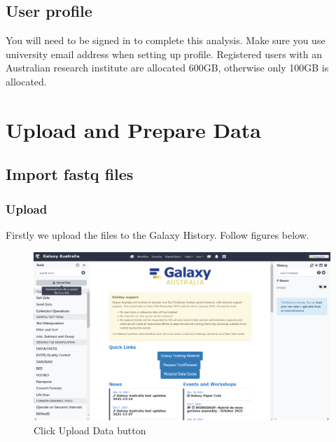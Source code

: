 \documentclass[
]{book}
\begin{document}
\hypertarget{user-profile}{%
\section*{User profile}\label{user-profile}}

You will need to be signed in to complete this analysis. Make sure you use university email address when setting up profile. Registered users with an Australian research institute are allocated 600GB, otherwise only 100GB is allocated.

\hypertarget{upload-and-prepare-data}{%
\chapter{Upload and Prepare Data}\label{upload-and-prepare-data}}

\hypertarget{import-fastq-files}{%
\section{Import fastq files}\label{import-fastq-files}}

\hypertarget{upload}{%
\subsection{Upload}\label{upload}}

Firstly we upload the files to the Galaxy History. Follow figures below.

\begin{figure}

{\centering \includegraphics[width=1\linewidth]{images/image001} 

}

\caption{Click Upload Data button}\label{fig:chunk1}
\end{figure}
\end{document}
